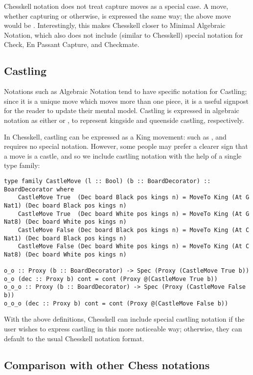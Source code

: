 Chesskell notation does not treat capture moves as a special case. A move, whether capturing or otherwise, is expressed the same way; the above move would be . Interestingly, this makes Chesskell closer to Minimal Algebraic Notation, which also does not include (similar to Chesskell) special notation for Check, En Passant Capture, and Checkmate.

\subsection{Castling} \label{castleextension}

Notations such as Algebraic Notation tend to have specific notation for Castling; since it is a unique move which moves more than one piece, it is a useful signpost for the reader to update their mental model. Castling is expressed in algebraic notation as either  or , to represent kingside and queenside castling, respectively.

In Chesskell, castling can be expressed as a King movement: such as , and requires no special notation. However, some people may prefer a clearer sign that a move is a castle, and so we include castling notation with the help of a single type family:

\begin{lstlisting}
type family CastleMove (l :: Bool) (b :: BoardDecorator) :: BoardDecorator where
    CastleMove True  (Dec board Black pos kings n) = MoveTo King (At G Nat1) (Dec board Black pos kings n)
    CastleMove True  (Dec board White pos kings n) = MoveTo King (At G Nat8) (Dec board White pos kings n)
    CastleMove False (Dec board Black pos kings n) = MoveTo King (At C Nat1) (Dec board Black pos kings n)
    CastleMove False (Dec board White pos kings n) = MoveTo King (At C Nat8) (Dec board White pos kings n)

o_o :: Proxy (b :: BoardDecorator) -> Spec (Proxy (CastleMove True b))
o_o (dec :: Proxy b) cont = cont (Proxy @(CastleMove True b))
o_o_o :: Proxy (b :: BoardDecorator) -> Spec (Proxy (CastleMove False b))
o_o_o (dec :: Proxy b) cont = cont (Proxy @(CastleMove False b))
\end{lstlisting}

With the above definitions, Chesskell can include special castling notation if the user wishes to express castling in this more noticeable way; otherwise, they can default to the usual Chesskell notation format.

\subsection{Comparison with other Chess notations}


